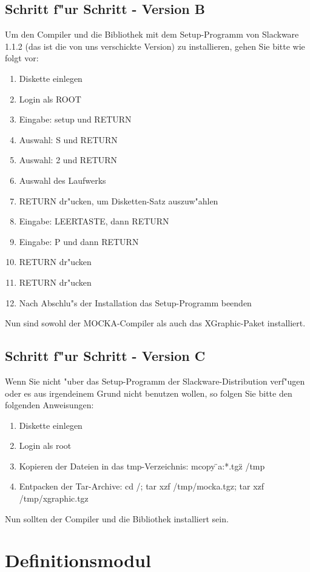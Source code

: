 \subsection{Schritt f"ur Schritt - Version B}
Um den Compiler und die Bibliothek mit dem Setup-Programm von Slackware 1.1.2
(das ist die von uns verschickte Version) zu installieren, gehen Sie bitte
wie folgt vor:

\begin{enumerate}
  \item{Diskette einlegen}
  \item{Login als ROOT}
  \item{Eingabe: setup und RETURN}
  \item{Auswahl: S und RETURN}
  \item{Auswahl: 2 und RETURN}
  \item{Auswahl des Laufwerks}
  \item{RETURN dr"ucken, um Disketten-Satz auszuw"ahlen}
  \item{Eingabe: LEERTASTE, dann RETURN}
  \item{Eingabe: P und dann RETURN}
  \item{RETURN dr"ucken}
  \item{RETURN dr"ucken}
  \item{Nach Abschlu"s der Installation das Setup-Programm beenden}
\end{enumerate}
Nun sind sowohl der MOCKA-Compiler als auch das XGraphic-Paket installiert.




\subsection{Schritt f"ur Schritt - Version C}

Wenn Sie nicht "uber das Setup-Programm der Slackware-Distribution verf"ugen
oder es aus irgendeinem Grund nicht benutzen wollen, so folgen Sie bitte den
folgenden Anweisungen:

\begin{enumerate}
   \item{Diskette einlegen}
   \item{Login als root}
   \item{Kopieren der Dateien in das tmp-Verzeichnis: mcopy \"\/a:*.tgz\"\/
/tmp}
   \item{Entpacken der Tar-Archive: cd /; tar xzf /tmp/mocka.tgz; tar xzf
/tmp/xgraphic.tgz}
\end{enumerate}
Nun sollten der Compiler und die Bibliothek installiert sein.










\section{Definitionsmodul}



